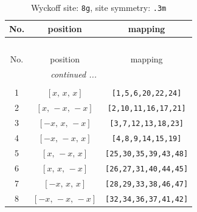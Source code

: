 \documentclass[fleqn,8pt]{jsarticle}
\begin{document}
\renewcommand{\arraystretch}{1.2}
\begin{longtable}{ccc}
\caption{Wyckoff site: {\tt 8g}, site symmetry: {\tt .3m}}
 \\
 \hline \hline
No. & position & mapping \\ \hline \endfirsthead

\multicolumn{2}{l}{\tablename\ \thetable{}} \\
 \hline \hline
No. & position & mapping \\ \hline \endhead

 \hline \hline
\multicolumn{2}{r}{\footnotesize\it continued ...} \\ \endfoot

 \hline \hline
\multicolumn{2}{r}{} \\ \endlastfoot

1 & $\left[ x,\, x,\, x \right]$ & {\tt [1,5,6,20,22,24]} \\ \hline
2 & $\left[ x,\, - x,\, - x \right]$ & {\tt [2,10,11,16,17,21]} \\ \hline
3 & $\left[ - x,\, x,\, - x \right]$ & {\tt [3,7,12,13,18,23]} \\ \hline
4 & $\left[ - x,\, - x,\, x \right]$ & {\tt [4,8,9,14,15,19]} \\ \hline
5 & $\left[ x,\, - x,\, x \right]$ & {\tt [25,30,35,39,43,48]} \\ \hline
6 & $\left[ x,\, x,\, - x \right]$ & {\tt [26,27,31,40,44,45]} \\ \hline
7 & $\left[ - x,\, x,\, x \right]$ & {\tt [28,29,33,38,46,47]} \\ \hline
8 & $\left[ - x,\, - x,\, - x \right]$ & {\tt [32,34,36,37,41,42]} \\
\end{longtable}
\renewcommand{\arraystretch}{1.2}
\end{document}
